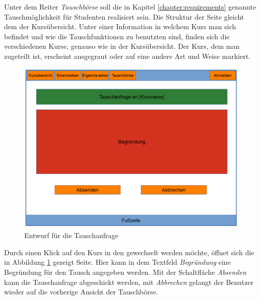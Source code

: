             Unter dem Reiter \textit{Tauschbörse} soll die in Kapitel \ref{chapter:requirements} genannte Tauschmöglichkeit für Studenten realisiert sein.
            Die Struktur der Seite gleicht dem der Kursübersicht.
            Unter einer Information in welchem Kurs man sich befindet und wie die Tauschfunktionen zu benutzten sind, finden sich die verschiedenen Kurse, genauso wie in der Kursübersicht.
            Der Kurs, dem man zugeteilt ist, erscheint ausgegraut oder auf eine andere Art und Weise markiert.
            
            \begin{figure}[t]
            	\centering
            	\includegraphics[width=\textwidth]{./design/images/MockUpsFrontend/frontendSwap2.png}
            	\caption{Entwurf für die Tauschanfrage}
            	\label{fig:mockupResultsSwap2}
            \end{figure}
            
            Durch einen Klick auf den Kurs in den gewechselt werden möchte, öffnet sich die in Abbildung \ref{fig:mockupResultsSwap2} gezeigt Seite.
            Hier kann in dem Textfeld \textit{Begründung} eine Begründung für den Tausch angegeben werden.
            Mit der Schaltfläche \textit{Absenden} kann die Tauschanfrage abgeschickt werden, mit \textit{Abbrechen} gelangt der Benutzer wieder auf die vorherige Ansicht der Tauschbörse.
            
                
            
    
